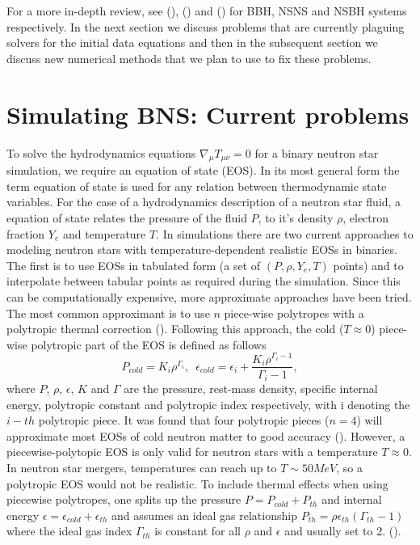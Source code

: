 For a more in-depth review, see (\cite{sperhake2014numerical}), (\cite{faber2012binary}) and (\cite{shibata2011coalescence}) for BBH, NSNS and NSBH systems respectively. In the next section we discuss problems that are currently plaguing solvers for the initial data equations and then in the subsequent section we discuss new numerical methods that we plan to use to fix these problems.

\section{Simulating BNS: Current problems}

To solve the hydrodynamics equations $\nabla_\mu T_{\mu\nu} = 0$ for a binary neutron star simulation, we require an equation of state (EOS). In its most general form the term equation of state is used for any relation between thermodynamic state variables. For the case of a hydrodynamics description of a neutron star fluid, a equation of state relates the pressure of the fluid $P$, to it's density $\rho$, electron fraction $Y_e$ and temperature $T$. In simulations there are two current approaches to modeling neutron stars with temperature-dependent realistic EOSs in binaries. The first is to use EOSs in tabulated form (a set of $(P,\rho,Y_e,T)$ points) and to interpolate between tabular points as required during the simulation. Since this can be computationally expensive, more approximate approaches have been tried. The most common approximant is to use $n$ piece-wise polytropes with a polytropic thermal correction (\cite{deaton2013black,kyutoku2013black,bauswein2014revealing,kyutoku2015dynamical}). Following this approach, the cold ($T \approx 0$) piece-wise polytropic part of the EOS is defined as follows
%
\begin{equation}
\label{eq:7}
P_{cold} = K_i\rho^{\Gamma_i},\,\,\, \epsilon_{cold} = \epsilon_i + \frac{K_{i}\rho^{\Gamma_{i}-1}}{\Gamma_{i}-1},
\end{equation}
%
where $P$, $\rho$, $\epsilon$, $K$ and $\Gamma$ are the pressure, rest-mass density, specific internal energy, polytropic constant and polytropic index respectively, with i denoting the $i-th$ polytropic piece. It was found that four polytropic pieces ($n=4$) will approximate most EOSs of cold neutron matter to good accuracy (\cite{read2008neutron}). However, a piecewise-polytopic EOS is only valid for neutron stars with a temperature $T \approx 0$. In neutron star mergers, temperatures can reach up to $T \sim 50 MeV$, so a polytropic EOS would not be realistic. To include thermal effects when using piecewise polytropes, one splits up the pressure $P = P_{cold} + P_{th}$ and internal energy $\epsilon = \epsilon_{cold}+\epsilon_{th}$ and assumes an ideal gas relationship $P_{th} = \rho \epsilon_{th}(\Gamma_{th}-1)$ where the ideal gas index $\Gamma_{th}$ is constant for all $\rho$ and $\epsilon$ and usually set to 2. (\cite{bauswein2010testing,takami2014constraining}).

